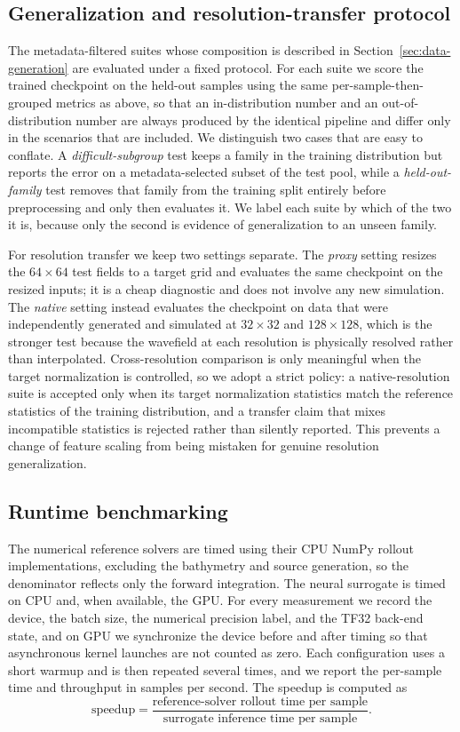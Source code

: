 \subsection{Generalization and resolution-transfer protocol}
\label{subsec:generalization-protocol}

The metadata-filtered suites whose composition is described in Section~\ref{sec:data-generation} are evaluated under a fixed protocol. For each suite we score the trained checkpoint on the held-out samples using the same per-sample-then-grouped metrics as above, so that an in-distribution number and an out-of-distribution number are always produced by the identical pipeline and differ only in the scenarios that are included. We distinguish two cases that are easy to conflate. A \emph{difficult-subgroup} test keeps a family in the training distribution but reports the error on a metadata-selected subset of the test pool, while a \emph{held-out-family} test removes that family from the training split entirely before preprocessing and only then evaluates it. We label each suite by which of the two it is, because only the second is evidence of generalization to an unseen family.

For resolution transfer we keep two settings separate. The \emph{proxy} setting resizes the $64 \times 64$ test fields to a target grid and evaluates the same checkpoint on the resized inputs; it is a cheap diagnostic and does not involve any new simulation. The \emph{native} setting instead evaluates the checkpoint on data that were independently generated and simulated at $32 \times 32$ and $128 \times 128$, which is the stronger test because the wavefield at each resolution is physically resolved rather than interpolated. Cross-resolution comparison is only meaningful when the target normalization is controlled, so we adopt a strict policy: a native-resolution suite is accepted only when its target normalization statistics match the reference statistics of the training distribution, and a transfer claim that mixes incompatible statistics is rejected rather than silently reported. This prevents a change of feature scaling from being mistaken for genuine resolution generalization.

\subsection{Runtime benchmarking}
\label{subsec:runtime}
The numerical reference solvers are timed using their CPU NumPy rollout implementations, excluding the bathymetry and source generation, so the denominator reflects only the forward integration. The neural surrogate is timed on CPU and, when available, the GPU. For every measurement we record the device, the batch size, the numerical precision label, and the TF32 back-end state, and on GPU we synchronize the device before and after timing so that asynchronous kernel launches are not counted as zero. Each configuration uses a short warmup and is then repeated several times, and we report the per-sample time and throughput in samples per second. The speedup is computed as
\[
\mathrm{speedup} =
\frac{\text{reference-solver rollout time per sample}}
    {\text{surrogate inference time per sample}}.
\]

